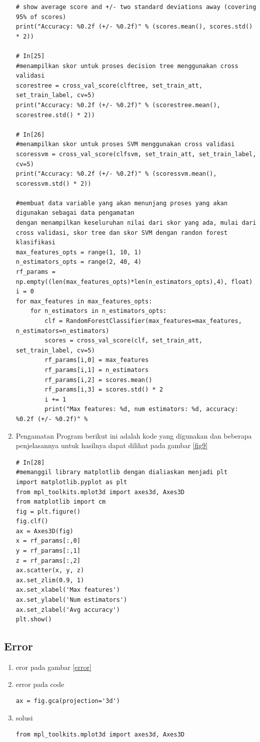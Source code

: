 \begin{enumerate}
\begin{verbatim}
# show average score and +/- two standard deviations away (covering 95% of scores)
print("Accuracy: %0.2f (+/- %0.2f)" % (scores.mean(), scores.std() * 2))

# In[25]
#menampilkan skor untuk proses decision tree menggunakan cross validasi
scorestree = cross_val_score(clftree, set_train_att, set_train_label, cv=5)
print("Accuracy: %0.2f (+/- %0.2f)" % (scorestree.mean(), scorestree.std() * 2))

# In[26]
#menampilkan skor untuk proses SVM menggunakan cross validasi
scoressvm = cross_val_score(clfsvm, set_train_att, set_train_label, cv=5)
print("Accuracy: %0.2f (+/- %0.2f)" % (scoressvm.mean(), scoressvm.std() * 2))

#membuat data variable yang akan menunjang proses yang akan digunakan sebagai data pengamatan
dengan menampilkan keseluruhan nilai dari skor yang ada, mulai dari cross validasi, skor tree dan skor SVM dengan randon forest klasifikasi
max_features_opts = range(1, 10, 1)
n_estimators_opts = range(2, 40, 4)
rf_params = np.empty((len(max_features_opts)*len(n_estimators_opts),4), float)
i = 0
for max_features in max_features_opts:
    for n_estimators in n_estimators_opts:
        clf = RandomForestClassifier(max_features=max_features, n_estimators=n_estimators)
        scores = cross_val_score(clf, set_train_att, set_train_label, cv=5)
        rf_params[i,0] = max_features
        rf_params[i,1] = n_estimators
        rf_params[i,2] = scores.mean()
        rf_params[i,3] = scores.std() * 2
        i += 1
        print("Max features: %d, num estimators: %d, accuracy: %0.2f (+/- %0.2f)" %
\end{verbatim}
\item Pengamatan Program
\subitem berikut ini adalah kode yang digunakan dan beberapa penjelasannya untuk hasilnya dapat dilihat pada gambar \ref{fig9}
\begin{verbatim}
# In[28]
#memanggil library matplotlib dengan dialiaskan menjadi plt
import matplotlib.pyplot as plt
from mpl_toolkits.mplot3d import axes3d, Axes3D
from matplotlib import cm
fig = plt.figure()
fig.clf()
ax = Axes3D(fig)
x = rf_params[:,0]
y = rf_params[:,1]
z = rf_params[:,2]
ax.scatter(x, y, z)
ax.set_zlim(0.9, 1)
ax.set_xlabel('Max features')
ax.set_ylabel('Num estimators')
ax.set_zlabel('Avg accuracy')
plt.show()
\end{verbatim}
\end{enumerate}
\subsection{Error}
\begin{enumerate}
\item eror pada gambar \ref{error}
\item error pada code 
\begin{verbatim}
ax = fig.gca(projection='3d')
\end{verbatim}
\item solusi 
\begin{verbatim}
from mpl_toolkits.mplot3d import axes3d, Axes3D
\end{verbatim}
\end{enumerate}

